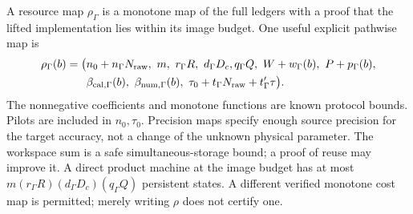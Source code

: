A resource map $\rho_\Gamma$ is a monotone map of the full ledgers with a proof that the lifted implementation lies within its image budget. One useful explicit pathwise map is
\begin{align}\label{eq:resource-map}
 \rho_\Gamma(b)=\big(&n_0+n_\Gamma N_{\rm raw},\ m,\ r_\Gamma R,\ d_\Gamma D_c,
 q_\Gamma Q,\ W+w_\Gamma(b),\ P+p_\Gamma(b),\notag\\
 &\beta_{{\rm cal},\Gamma}(b),\ \beta_{{\rm num},\Gamma}(b),\
 \tau_0+t_\Gamma N_{\rm raw}+t'_{\Gamma}\tau\big).
\end{align}
The nonnegative coefficients and monotone functions are known protocol bounds. Pilots are included in $n_0,\tau_0$. Precision maps specify enough source precision for the target accuracy, not a change of the unknown physical parameter. The workspace sum is a safe simultaneous-storage bound; a proof of reuse may improve it. A direct product machine at the image budget has at most $m(r_\Gamma R)(d_\Gamma D_c)(q_\Gamma Q)$ persistent states. A different verified monotone cost map is permitted; merely writing $\rho$ does not certify one.

